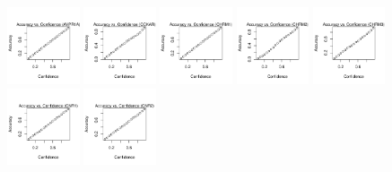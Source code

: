 \documentclass[10pt,article]{memoir}
\begin{document}
\begin{figure}[h!]
\includegraphics[width=0.19\textwidth]{figures/calibration_plots/avpr1a_calib.pdf}
\includegraphics[width=0.19\textwidth]{figures/calibration_plots/cckar_calib.pdf}
\includegraphics[width=0.19\textwidth]{figures/calibration_plots/chrm1_calib.pdf}
\includegraphics[width=0.19\textwidth]{figures/calibration_plots/chrm2_calib.pdf}
\includegraphics[width=0.19\textwidth]{figures/calibration_plots/chrm3_calib.pdf}
\includegraphics[width=0.19\textwidth]{figures/calibration_plots/cnr1_calib.pdf}
\includegraphics[width=0.19\textwidth]{figures/calibration_plots/cnr2_calib.pdf}

\end{figure}
\end{document}
